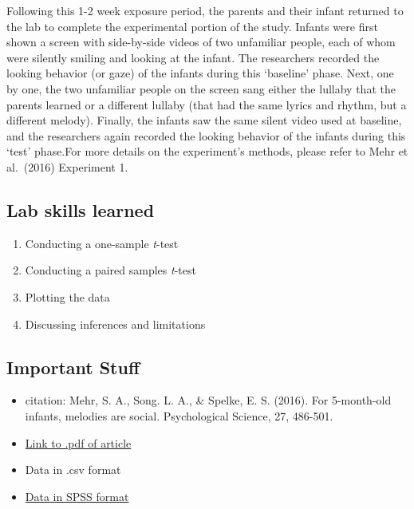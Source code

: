 \documentclass[
]{book}
\providecommand{\tightlist}{%
  \setlength{\itemsep}{0pt}\setlength{\parskip}{0pt}}
\begin{document}
Following this 1-2 week exposure period, the parents and their infant returned to the lab to complete the experimental portion of the study. Infants were first shown a screen with side-by-side videos of two unfamiliar people, each of whom were silently smiling and looking at the infant. The researchers recorded the looking behavior (or gaze) of the infants during this `baseline' phase. Next, one by one, the two unfamiliar people on the screen sang either the lullaby that the parents learned or a different lullaby (that had the same lyrics and rhythm, but a different melody). Finally, the infants saw the same silent video used at baseline, and the researchers again recorded the looking behavior of the infants during this `test' phase.For more details on the experiment's methods, please refer to Mehr et al.~(2016) Experiment 1.

\hypertarget{lab-skills-learned}{%
\subsection{Lab skills learned}\label{lab-skills-learned}}

\begin{enumerate}
\def\labelenumi{\arabic{enumi}.}
\tightlist
\item
  Conducting a one-sample \emph{t}-test
\item
  Conducting a paired samples \emph{t}-test
\item
  Plotting the data
\item
  Discussing inferences and limitations
\end{enumerate}

\hypertarget{important-stuff}{%
\subsection{Important Stuff}\label{important-stuff}}

\begin{itemize}
\tightlist
\item
  citation: Mehr, S. A., Song. L. A., \& Spelke, E. S. (2016). For 5-month-old infants, melodies are social. Psychological Science, 27, 486-501.
\item
  \href{http://journals.sagepub.com/stoken/default+domain/d5HcBHg85XamSXGdYqYN/full}{Link to .pdf of article}
\item
  Data in .csv format
\item
  \href{https://drive.google.com/open?id=0Bz-rhZ21ShvOa3c4X3hqOWxwcUU}{Data in SPSS format}
\end{itemize}
\end{document}
